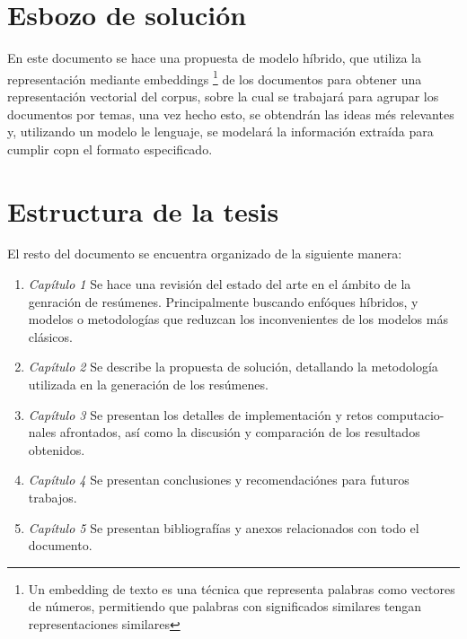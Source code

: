 \section{Esbozo de solución}
    En este documento se hace una propuesta de modelo híbrido, que utiliza la representación mediante embeddings \footnote{Un embedding de texto es una técnica que representa palabras como vectores de números, permitiendo que palabras con significados similares tengan representaciones similares}
    de los documentos para obtener una representación vectorial del corpus, sobre la cual se trabajará para agrupar los documentos por temas, una vez hecho esto, se obtendrán las ideas més relevantes y, utilizando un modelo le lenguaje, se modelará la información extraída para cumplir copn el formato especificado.
\section{Estructura de la tesis}
        El resto del documento se encuentra organizado de la siguiente manera:

        \begin{enumerate}
            \item \emph{Capítulo 1} Se hace una revisión del estado del arte en el ámbito de la genración de resúmenes. Principalmente buscando enfóques híbridos, y modelos o metodologías que reduzcan los inconvenientes de los modelos más clásicos.
            \item \emph{Capítulo 2} Se describe la propuesta de solución, detallando la metodología utilizada en la generación de los resúmenes.
            \item \emph{Capítulo 3} Se presentan los detalles de implementación y retos computacio-
            nales afrontados, así como la discusión y comparación de los resultados obtenidos.
            \item \emph{Capítulo 4} Se presentan conclusiones y recomendaciónes para futuros trabajos.
            \item \emph{Capítulo 5} Se presentan bibliografías y anexos relacionados con todo el documento.
        \end{enumerate}


